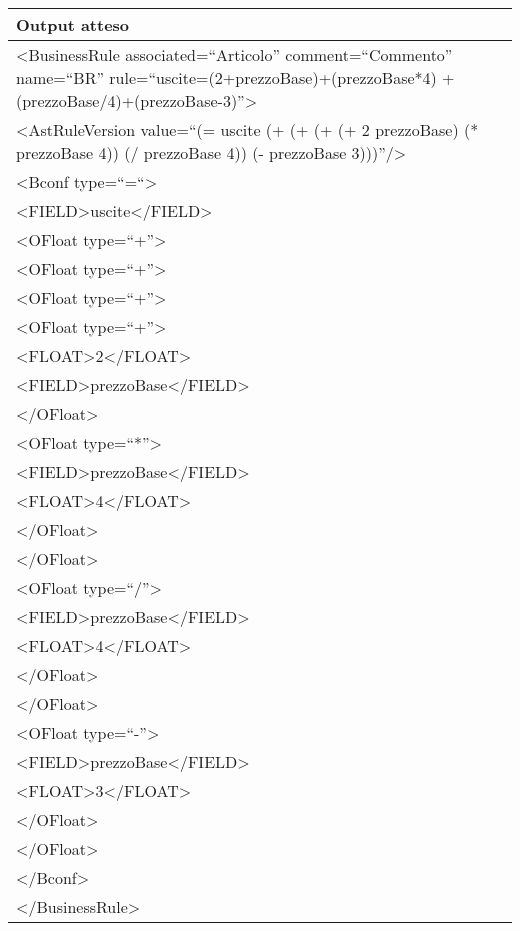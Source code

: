 \begin{center}
\begin{tabular}{|p{11cm}|} \hline
\textbf{Output atteso}\\ \hline
\textless BusinessRule associated=``Articolo'' comment=``Commento'' name=``BR'' rule=``uscite=(2+prezzoBase)+(prezzoBase*4) +(prezzoBase/4)+(prezzoBase-3)''\textgreater\\
 \textless AstRuleVersion value=``(= uscite (+ (+ (+ (+ 2 prezzoBase) (* prezzoBase 4)) (/ prezzoBase 4)) (- prezzoBase 3)))''/\textgreater \\
\textless Bconf type=``=``\textgreater \\
\textless FIELD\textgreater uscite\textless /FIELD\textgreater \\
\textless OFloat type=``+''\textgreater \\
\textless OFloat type=``+''\textgreater \\
\textless OFloat type=``+''\textgreater \\
\textless OFloat type=``+''\textgreater \\
\textless FLOAT\textgreater 2\textless /FLOAT\textgreater \\
\textless FIELD\textgreater prezzoBase\textless /FIELD\textgreater \\
\textless /OFloat\textgreater \\
\textless OFloat type=``*''\textgreater \\
\textless FIELD\textgreater prezzoBase\textless /FIELD\textgreater \\
\textless FLOAT\textgreater 4\textless /FLOAT\textgreater \\
\textless /OFloat\textgreater \\
\textless /OFloat\textgreater \\
\textless OFloat type=``/''\textgreater\\
 \textless FIELD\textgreater prezzoBase\textless /FIELD\textgreater \\
\textless FLOAT\textgreater 4\textless /FLOAT\textgreater \\
\textless /OFloat\textgreater \\
\textless /OFloat\textgreater \\
\textless OFloat type=``-''\textgreater \\
\textless FIELD\textgreater prezzoBase\textless /FIELD\textgreater \\
\textless FLOAT\textgreater 3\textless /FLOAT\textgreater \\
\textless /OFloat\textgreater\\
 \textless /OFloat\textgreater\\
 \textless /Bconf\textgreater \\
\textless /BusinessRule\textgreater \\
 \hline
\end{tabular} \\
\end{center}

